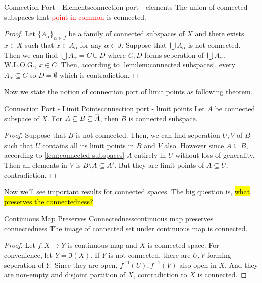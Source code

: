 \documentclass[12pt, a4paper, twoside]{article}
\newcommand{\overbar}[1]{\mkern 1.5mu\overline{\mkern-1.5mu#1\mkern-1.5mu}\mkern 1.5mu}
\theoremstyle{plain}
\begin{document}
\begin{lem}{Connection Port - Elements}{connection port - elements}
    The union of connected subspaces that \textcolor{red}{point in common} is connected. 
\end{lem}

\begin{proof}
    Let $\{A_\alpha\}_{\alpha \in J}$ be a family of connected subspaces of $X$ and there exists $x \in X$ such that $x \in A_\alpha$ for any $\alpha \in J$. 
    Suppose that $\bigcup A_\alpha$ is not connected. Then we can find $\bigcup A_\alpha = C \cup D$ where 
    $C, D$ forms seperation of $\bigcup A_\alpha$. W.L.O.G., $x \in C$. 
    Then, according to \ref{lem:lem:connected subspaces}, every $A_\alpha \subseteq C$ so $D = \emptyset$ which is contradiction. 
\end{proof}

Now we state the notion of connection port of limit points as following theorem. 

\begin{thm}{Connection Port - Limit Points}{connection port - limit points}
    Let $A$ be connected subspace of $X$. For $A \subseteq B \subseteq \overbar{A}$, then
    $B$ is connected subspace. 
\end{thm}

\begin{proof}
    Suppose that $B$ is not connected. Then, we can find seperation $U, V$ of $B$ such that 
    $U$ contains all its limit points in $B$ and $V$ also. However since $A \subseteq B$, according to \ref{lem:connected subspaces}
    $A$ entirely in $U$ without loss of generality. 
    Then all elements in $V$ is $B \setminus A \subseteq A'$. But they are limit points of $A \subseteq U$, contradiction. 
\end{proof}

Now we'll see important results for connected spaces. The big question is, \hl{what preserves the connectedness?}

\begin{thm}{Continuous Map Preserves Connectedness}{continuous map preserves connectedness}
    The image of connected set under continuous map is connected. 
\end{thm}

\begin{proof}
    Let $f: X \rightarrow Y$ is continuous map and $X$ is connected space. 
    For convenience, let $Y = \Im(X)$. 
    If $Y$ is not connected, there are $U, V$ forming seperation of $Y$. 
    Since they are open, $f^{-1}(U), f^{-1}(V)$ also open in $X$. 
    And they are non-empty and disjoint partition of $X$, contradiction to $X$ is connected. 
\end{proof}
\end{document}
